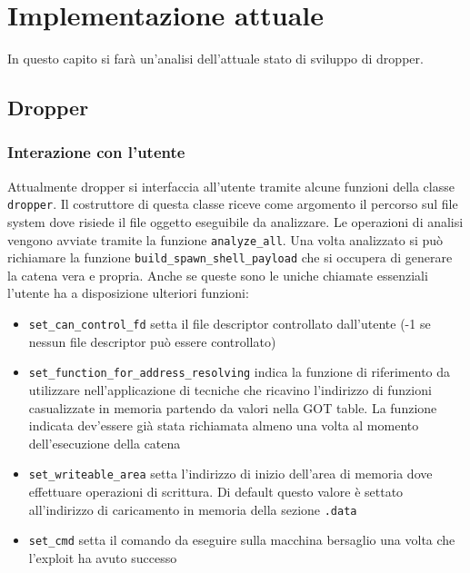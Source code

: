 \chapter{Implementazione attuale}
\label{cap:implementazione}
In questo capito si farà un'analisi dell'attuale stato di sviluppo di dropper.

\section{Dropper}

\subsection{Interazione con l'utente}

Attualmente dropper si interfaccia all'utente tramite alcune funzioni
della classe \lstinline{dropper}. Il costruttore di questa classe
riceve come argomento il percorso sul file system dove risiede il file
oggetto eseguibile da analizzare. Le operazioni di analisi vengono
avviate tramite la funzione \lstinline{analyze_all}. Una volta
analizzato si può richiamare la funzione
\lstinline{build_spawn_shell_payload} che si occupera di generare la
catena vera e propria. Anche se queste sono le uniche chiamate
essenziali l'utente ha a disposizione ulteriori funzioni:
\begin{itemize}

\item \lstinline{set_can_control_fd} setta il file descriptor
  controllato dall'utente (-1 se nessun file descriptor può essere
  controllato)

\item \lstinline{set_function_for_address_resolving} indica la
  funzione di riferimento da utilizzare nell'applicazione di tecniche
  che ricavino l'indirizzo di funzioni casualizzate in memoria
  partendo da valori nella GOT table. La funzione indicata dev'essere
  già stata richiamata almeno una volta al momento dell'esecuzione
  della catena

\item \lstinline{set_writeable_area} setta l'indirizzo di inizio
  dell'area di memoria dove effettuare operazioni di scrittura. Di
  default questo valore è settato all'indirizzo di caricamento in
  memoria della sezione \lstinline{.data}

\item \lstinline{set_cmd} setta il comando da eseguire sulla macchina
  bersaglio una volta che l'exploit ha avuto successo

\end{itemize}

